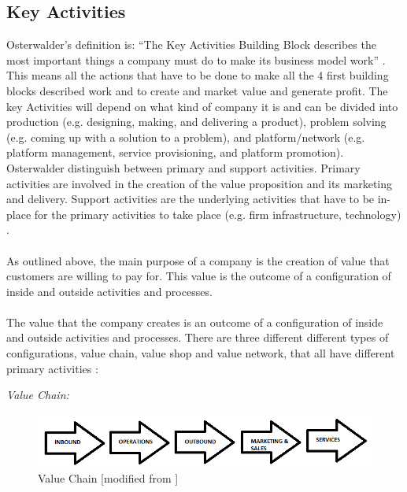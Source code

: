 \subsection{Key Activities}
Osterwalder’s definition is: “The Key Activities Building Block describes the most important things a company must do to make its business model work” \cite{osterwalder}. This means all the actions that have to be done to make all the 4 first building blocks described work and to create and market value and generate profit. The key Activities will depend on what kind of company it is and can be divided into production (e.g. designing, making, and delivering a product), problem solving (e.g. coming up with a solution to a problem), and platform/network (e.g. platform management, service provisioning, and platform promotion). 
Osterwalder distinguish between primary and support activities. Primary activities are involved in the creation of the value proposition and its marketing and delivery. Support activities are the underlying activities that have to be in-place for the primary activities to take place (e.g. firm infrastructure, technology) \cite{osterwalderthesis}.\\ \\
As outlined above, the main purpose of a company is the creation of value that customers are willing to pay for. This value is the outcome of a configuration of inside and outside activities and processes.\\ \\
The value that the company creates is an outcome of a configuration of inside and outside activities and processes. There are three different different types of configurations, value chain, value shop and value network, that all have different primary activities \cite{osterwalderthesis}:

\newpage

\emph{Value Chain:} 

\begin{figure}[h]
\caption[ValueChain]{Value Chain [modified from \cite{osterwalderthesis}]}
\label{fig:ValueChain}
\begin{center}
\includegraphics[scale=0.8]{valuechain}
\end{center}
\end{figure}


